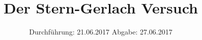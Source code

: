 

\subject{V25}
\title{Der Stern-Gerlach Versuch}
\date{
  Durchführung: 21.06.2017
  \hspace{3em}
  Abgabe: 27.06.2017
}



\maketitle
\thispagestyle{empty}
\tableofcontents
\newpage






\printbibliography


